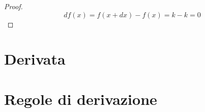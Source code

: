 \begin{proof}
\[
 df(x)=f(x+dx)-f(x)=k-k=0
\]
\end{proof}


% 
% 
 
\section{Derivata}
\label{sec:02_logaritmiche}


\section{Regole di derivazione}
\label{sec:02_logaritmiche}

